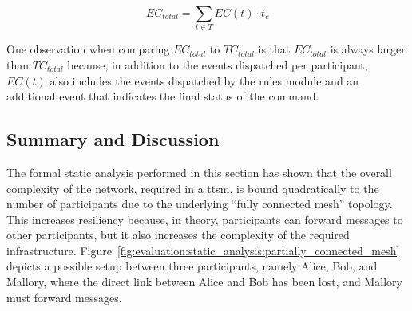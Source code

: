 \begin{equation}
\label{eq:ttsm:proposal:total_number_of_events_per_bp}
EC_{total} = \sum_{t \in T} EC(t) \cdot t_c
\end{equation}

One observation when comparing $EC_{total}$ to $TC_{total}$ is that $EC_{total}$ is always larger than $TC_{total}$ because, in addition to the events dispatched per participant, $EC(t)$ also includes the events dispatched by the rules module and an additional event that indicates the final status of the command.








\subsection{Summary and Discussion}
\label{sec:evaluation:static_analysis:summary}
The formal static analysis performed in this section has shown that the overall complexity of the network, required in a \gls{ttsm}, is bound quadratically to the number of participants due to the underlying ``fully connected mesh'' topology. This increases resiliency because, in theory, participants can forward messages to other participants, but it also increases the complexity of the required infrastructure. Figure~\ref{fig:evaluation:static_analysis:partially_connected_mesh} depicts a possible setup between three participants, namely Alice, Bob, and Mallory, where the direct link between Alice and Bob has been lost, and Mallory must forward messages.

